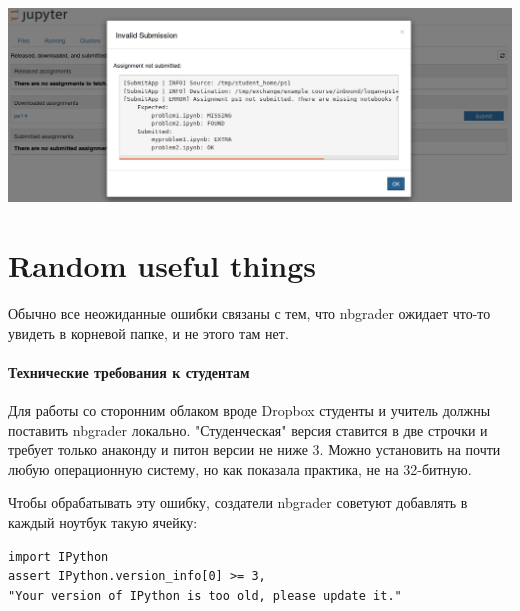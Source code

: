 \documentclass[a4paper,12pt]{article}
\begin{document}
\includegraphics[width=\textwidth]{assignment_list_submit_error}

\section{Random useful things}

Обычно все неожиданные ошибки связаны с тем, что nbgrader ожидает что-то увидеть в корневой папке, и не этого там нет.

\paragraph{Технические требования к студентам}
Для работы со сторонним облаком вроде Dropbox студенты и учитель должны поставить nbgrader локально. "Студенческая" версия ставится в две строчки и требует только анаконду и питон версии не ниже 3. Можно установить на почти любую операционную систему, но как показала практика, не на 32-битную.

Чтобы обрабатывать эту ошибку, создатели nbgrader советуют добавлять в каждый ноутбук такую ячейку:

\begin{verbatim} 
import IPython
assert IPython.version_info[0] >= 3,
"Your version of IPython is too old, please update it."
\end{verbatim} 
\end{document}
